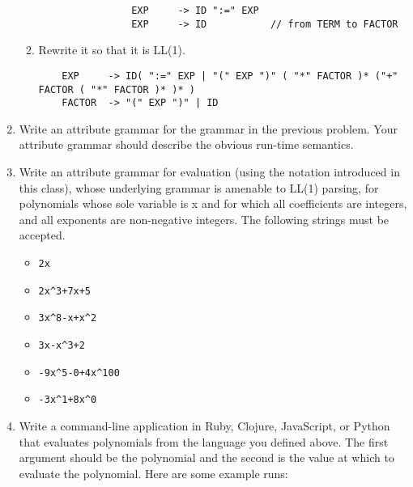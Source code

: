 \documentclass{article}
\begin{document}
\begin{enumerate}
\begin{enumerate}
            \begin{verbatim}
                EXP     -> ID ":=" EXP
                EXP     -> ID           // from TERM to FACTOR
            \end{verbatim}
            \item Rewrite it so that it is LL(1).
\begin{verbatim}
    EXP     -> ID( ":=" EXP | "(" EXP ")" ( "*" FACTOR )* ("+" FACTOR ( "*" FACTOR )* )* )
    FACTOR  -> "(" EXP ")" | ID
\end{verbatim}
        \end{enumerate}
    \pagebreak
    \item Write an attribute grammar for the grammar in the previous problem. Your attribute grammar should describe the obvious run-time semantics.
        
    \pagebreak
    \item Write an attribute grammar for evaluation (using the notation introduced in this class), whose underlying grammar is amenable to LL(1) parsing, for polynomials whose sole variable is x and for which all coefficients are integers, and all exponents are non-negative integers. The following strings must be accepted.
        \begin{itemize}
            \item \begin{verbatim}2x\end{verbatim}
            \item \begin{verbatim}2x^3+7x+5\end{verbatim}
            \item \begin{verbatim}3x^8-x+x^2\end{verbatim}
            \item \begin{verbatim}3x-x^3+2\end{verbatim}
            \item \begin{verbatim}-9x^5-0+4x^100\end{verbatim}
            \item \begin{verbatim}-3x^1+8x^0\end{verbatim}
        \end{itemize}
    \pagebreak
    \item Write a command-line application in Ruby, Clojure, JavaScript, or Python that evaluates polynomials from the language you defined above. The first argument should be the polynomial and the second is the value at which to evaluate the polynomial. Here are some example runs:

\end{enumerate}
\end{document}
